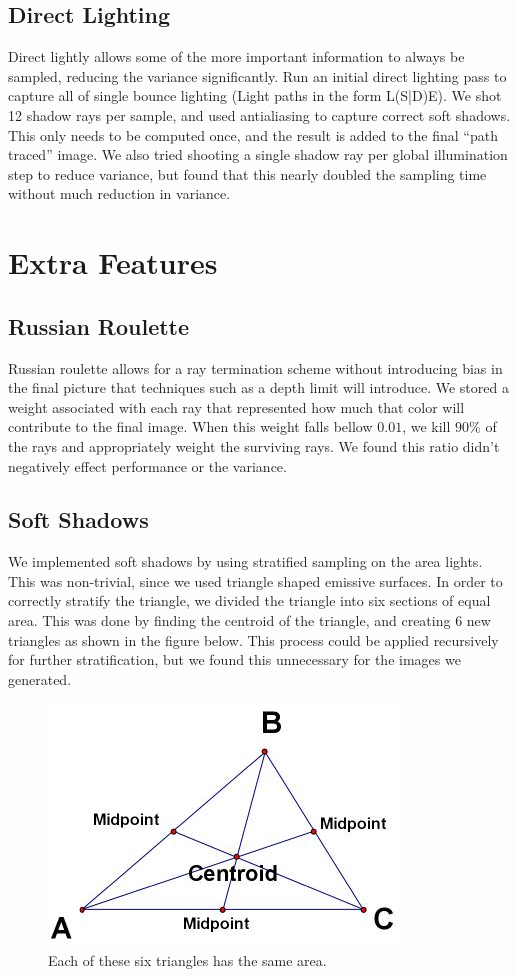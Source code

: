 \documentclass[11pt]{article}
\begin{document}
\subsection{Direct Lighting}
Direct lightly allows some of the more important information to always be sampled, reducing the variance significantly. Run an initial direct lighting pass to capture all of single bounce lighting (Light paths in the form L(S|D)E). We shot 12 shadow rays per sample, and used antialiasing to capture correct soft shadows. This only needs to be computed once, and the result is added to the final ``path traced'' image. We also tried shooting a single shadow ray per global illumination step to reduce variance, but found that this nearly doubled the sampling time without much reduction in variance. 


\section{Extra Features}

\subsection{Russian Roulette}
Russian roulette allows for a ray termination scheme without introducing bias in the final picture that techniques such as a depth limit will introduce. We stored a weight associated with each ray that represented how much that color will contribute to the final image. When this weight falls bellow $0.01$, we kill $90\%$ of the rays and appropriately weight the surviving rays. We found this ratio didn't negatively effect performance or the variance.

\subsection{Soft Shadows}
We implemented soft shadows by using stratified sampling on the area lights. This was non-trivial, since we used triangle shaped emissive surfaces. In order to correctly stratify the triangle, we divided the triangle into six sections of equal area. This was done by finding the centroid of the triangle, and creating 6 new triangles as shown in the figure below. This process could be applied recursively for further stratification, but we found this unnecessary for the images we generated.

\begin{figure}
	\begin{center}
		\includegraphics[width=.5\linewidth]{figs/centroid}
		\caption{Each of these six triangles has the same area.}
	\end{center}
\end{figure}
\end{document}
